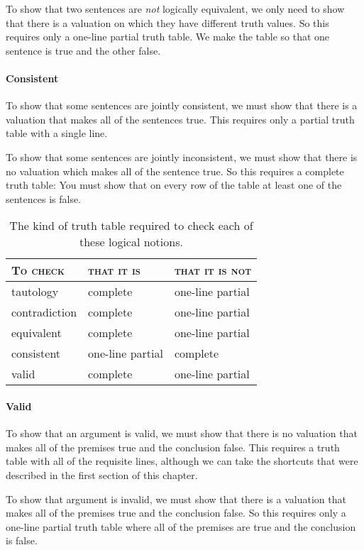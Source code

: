To show that two sentences are \emph{not} logically equivalent, we only need to show that there is a valuation on which they have different truth values. So this requires only a one-line partial truth table. We make the table so that one sentence is true and the other false.

\paragraph{Consistent}
To show that some sentences are jointly consistent, we must show that there is a valuation that makes all of the sentences true. This requires only a partial truth table with a single line. 

To show that some sentences are jointly inconsistent, we must show that there is no valuation which makes all of the sentence true. So this requires a complete truth table: You must show that on every row of the table at least one of the sentences is false.

\begin{table*}\centering\sffamily\footnotesize
{}
\begin{tabular}{@{}l l l@{}}\toprule
\textsc{To check} & \textsc{that it is} & \textsc{that it is not}\\\midrule
tautology & complete & one-line partial \\
contradiction &  complete & one-line partial \\
equivalent & complete  & one-line partial \\
consistent & one-line partial & complete \\
valid & complete & one-line partial \\
\bottomrule
\end{tabular}
\caption{The kind of truth table required to check each of these logical notions.}\label{table.CompleteVsPartial}
\end{table*}

\paragraph{Valid}
To show that an argument is valid, we must show that there is no valuation that makes all of the premises true and the conclusion false. This requires a truth table with all of the requisite lines, although we can take the shortcuts that were described in the first section of this chapter.  

To show that argument is invalid, we must show that there is a valuation that makes all of the premises true and the conclusion false. So this requires only a one-line partial truth table where all of the premises are true and the conclusion is false.


